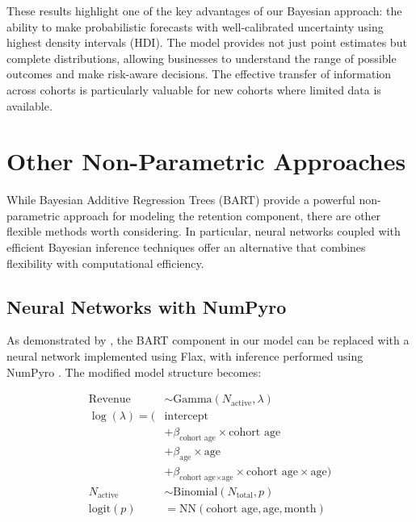 \documentclass[11pt]{amsart}
\theoremstyle{definition}
\begin{document}
These results highlight one of the key advantages of our Bayesian approach: the ability to make probabilistic forecasts with
well-calibrated uncertainty using highest density intervals (HDI). The model provides not just point estimates but complete
distributions, allowing businesses to understand the range of possible outcomes and make risk-aware decisions. The effective
transfer of information across cohorts is particularly valuable for new cohorts where limited data is available.

\section{Other Non-Parametric Approaches}

While Bayesian Additive Regression Trees (BART) provide a powerful non-parametric approach for modeling the retention
component, there are other flexible methods worth considering. In particular, neural networks coupled with efficient
Bayesian inference techniques offer an alternative that combines flexibility with computational efficiency.

\subsection{Neural Networks with NumPyro}

As demonstrated by \cite{orduz_revenue_retention_numpyro}, the BART component in our model can be replaced with a neural
network implemented using Flax, with inference performed using NumPyro \cite{phan2019composable}. The modified model
structure becomes:

\begin{align*}
    \text{Revenue}    & \sim \text{Gamma}(N_{\text{active}}, \lambda)                                             \\
    \log(\lambda) = ( & \text{intercept}                                                                          \\
                      & + \beta_{\text{cohort age}} \times \text{cohort age}                                      \\
                      & + \beta_{\text{age}} \times \text{age}                                                    \\
                      & + \beta_{\text{cohort age} \times \text{age}} \times \text{cohort age} \times \text{age}) \\
    N_{\text{active}} & \sim \text{Binomial}(N_{\text{total}}, p)                                                 \\
    \textrm{logit}(p) & = \text{NN}(\text{cohort age}, \text{age}, \text{month})
\end{align*}
\end{document}
